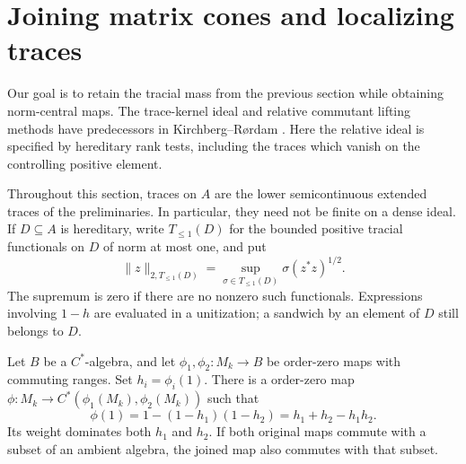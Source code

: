 \section{Joining matrix cones and localizing traces}
\label{sec:localization}

Our goal is to retain the tracial mass from the previous section while
obtaining norm-central maps. The trace-kernel ideal and relative
commutant lifting methods have predecessors in Kirchberg--R\o rdam
\cite[Section~4]{KirchbergRordam2014}. Here the relative ideal is
specified by hereditary rank tests, including the traces which vanish
on the controlling positive element.

Throughout this section, traces on $A$ are the lower semicontinuous
extended traces of the preliminaries.  In particular, they need not be
finite on a dense ideal.  If $D\subseteq A$ is hereditary, write
$T_{\leq1}(D)$ for the bounded positive tracial functionals on $D$ of
norm at most one, and put
\[
 \|z\|_{2,T_{\leq1}(D)}
   =\sup_{\sigma\in T_{\leq1}(D)}\sigma(z^*z)^{1/2}.
\]
The supremum is zero if there are no nonzero such functionals.  Expressions
involving $1-h$ are evaluated in a unitization; a sandwich by an element
of $D$ still belongs to $D$.

\begin{lemma}\label{lem:join}
Let $B$ be a $C^*$-algebra, and let $\phi_1,\phi_2:M_k\to B$ be
\cpc order-zero maps with commuting ranges.  Set $h_i=\phi_i(1)$.
There is a \cpc order-zero map $\phi:M_k\to
C^*(\phi_1(M_k),\phi_2(M_k))$ such that
\begin{equation}\label{loc:join-weight}
 \phi(1)=1-(1-h_1)(1-h_2)=h_1+h_2-h_1h_2.
\end{equation}
Its weight dominates both $h_1$ and $h_2$.  If both original maps commute
with a subset of an ambient algebra, the joined map also commutes with
that subset.
\end{lemma}

